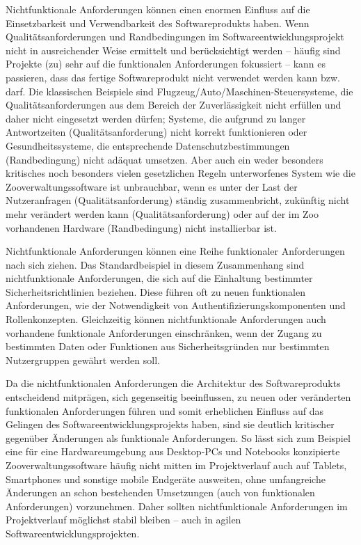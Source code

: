 Nichtfunktionale Anforderungen können einen enormen Einfluss auf die Einsetzbarkeit und Verwendbarkeit des Softwareprodukts haben. Wenn Qualitätsanforderungen und Randbedingungen im Softwareentwicklungsprojekt nicht in ausreichender Weise ermittelt und berücksichtigt werden -- häufig sind Projekte (zu) sehr auf die funktionalen Anforderungen fokussiert -- kann es passieren, dass das fertige Softwareprodukt nicht verwendet werden kann bzw. darf. Die klassischen Beispiele sind Flugzeug/Auto/Maschinen-Steuersysteme, die Qualitätsanforderungen aus dem Bereich der Zuverlässigkeit nicht erfüllen und daher nicht eingesetzt werden dürfen; Systeme, die aufgrund zu langer Antwortzeiten (Qualitätsanforderung) nicht korrekt funktionieren oder Gesundheitssysteme, die entsprechende Datenschutzbestimmungen (Randbedingung) nicht adäquat umsetzen. Aber auch ein weder besonders kritisches noch besonders vielen gesetzlichen Regeln unterworfenes System wie die Zooverwaltungssoftware ist unbrauchbar, wenn es unter der Last der Nutzer\-anfragen (Qualitätsanforderung) ständig zusammenbricht, zukünftig nicht mehr verändert werden kann (Qualitätsanforderung) oder auf der im Zoo vorhandenen Hardware (Randbedingung) nicht installierbar ist.

Nichtfunktionale Anforderungen können eine Reihe funktionaler Anforderungen nach sich ziehen. Das Standardbeispiel in diesem Zusammenhang sind nichtfunktionale Anforderungen, die sich auf die Einhaltung bestimmter Sicherheitsrichtlinien beziehen. Diese führen oft zu neuen funktionalen Anforderungen, wie der Notwendigkeit von Authentifizierungskomponenten und Rollenkonzepten. Gleichzeitig können nichtfunktionale Anforderungen auch vorhandene funktionale Anforderungen einschränken, wenn \zb der Zugang zu bestimmten Daten oder Funktionen aus Sicherheitsgründen nur bestimmten Nutzergruppen gewährt werden soll.

Da die nichtfunktionalen Anforderungen die Architektur des Softwareprodukts entscheidend mitprägen, sich gegenseitig beeinflussen, zu neuen oder veränderten funktionalen Anforderungen führen und somit erheblichen Einfluss auf das Gelingen des Softwareentwicklungsprojekts haben, sind sie deutlich kritischer gegenüber Änderungen als funktionale Anforderungen. So lässt sich zum Beispiel eine für eine Hardware\-umgebung aus Desktop-PCs und Notebooks konzipierte Zooverwaltungssoftware häufig nicht mitten im Projektverlauf auch auf Tablets, Smartphones und sonstige mobile Endgeräte ausweiten, ohne umfangreiche Änderungen an schon \mbox{bestehenden} Umsetzungen (auch von funktionalen Anforderungen) vorzunehmen. Daher sollten nichtfunktionale Anforderungen im Projektverlauf möglichst stabil bleiben -- auch in agilen Softwareentwicklungsprojekten.